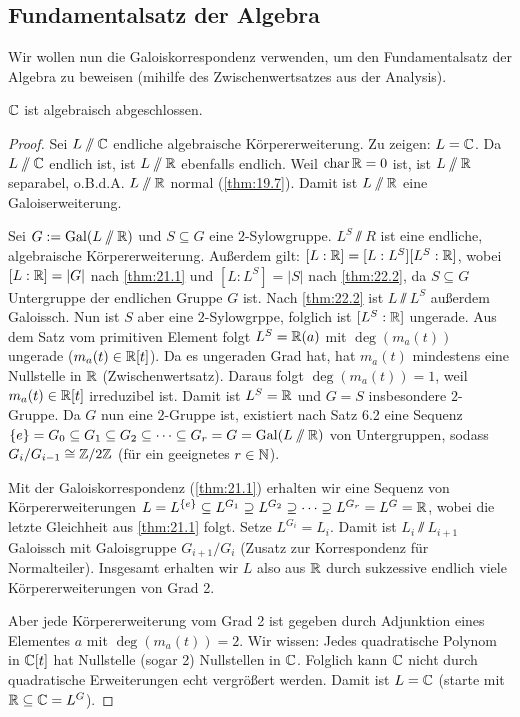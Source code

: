 \documentclass[12pt,a4paper]{scrartcl}
\begin{document}
\subsection{Fundamentalsatz der Algebra}
Wir wollen nun die Galoiskorrespondenz verwenden, um den Fundamentalsatz der Algebra zu beweisen (mihilfe des Zwischenwertsatzes aus der Analysis).
\begin{satz}\label{thm:fundamentalsatz}
	$\mathbb C$ ist algebraisch abgeschlossen.
\end{satz}
\begin{proof}
	Sei $L\sslash \mathbb C$ endliche algebraische Körpererweiterung. Zu zeigen: $L = \mathbb C$. Da $L\sslash \mathbb C$ endlich ist, ist $L\sslash \mathbb R$ ebenfalls endlich. Weil $\operatorname{char} \mathbb R= 0$ ist, ist $L\sslash \mathbb R$ separabel, o.B.d.A. $L\sslash \mathbb R$ normal (\ref{thm:19.7}). Damit ist $L\sslash \mathbb R$ eine Galoiserweiterung.
	
	Sei $G:= \operatorname{Gal}(L\sslash \mathbb R)$ und $S\subseteq G$ eine $2$-Sylowgruppe. $L^S\sslash R$ ist eine endliche, algebraische Körpererweiterung. Außerdem gilt: $[L:\mathbb R] = [L:L^S][L^S:\mathbb R]$, wobei $[L:\mathbb R] = |G|$ nach \ref{thm:21.1} und $[L:L^S] = |S|$ nach \ref{thm:22.2}, da $S\subseteq G$ Untergruppe der endlichen Gruppe $G$ ist. Nach \ref{thm:22.2} ist $L\sslash L^S$ außerdem Galoissch. Nun ist $S$ aber eine $2$-Sylowgrppe, folglich ist $[L^S:\mathbb R]$ ungerade. Aus dem Satz vom primitiven Element folgt $L^S = \mathbb R(a)$ mit $\deg(m_a(t))$ ungerade ($m_a(t)\in\mathbb R[t]$). Da es ungeraden Grad hat, hat $m_a(t)$ mindestens eine Nullstelle in $\mathbb R$ (Zwischenwertsatz). Daraus folgt $\deg(m_a(t)) = 1$, weil $m_a(t)\in\mathbb R[t]$ irreduzibel ist. Damit ist $L^S =\mathbb R$ und $G =S$ insbesondere $2$-Gruppe. Da $G$ nun eine $2$-Gruppe ist, existiert nach Satz 6.2 eine Sequenz $\{e\} = G_0\subseteq G_1\subseteq G_2\subseteq\dots\subseteq G_r = G = \operatorname{Gal}(L\sslash \mathbb R)$ von Untergruppen, sodass $G_i/G_{i-1} \cong \mathbb Z/2\mathbb Z$ (für ein geeignetes $r\in\mathbb N$).
	
	Mit der Galoiskorrespondenz (\ref{thm:21.1}) erhalten wir eine Sequenz von Körpererweiterungen $L = L^{\{e\}}\subseteq L^{G_1}\supseteq L^{G_2}\supseteq\dots \supseteq L^{G_r} = L^G = \mathbb R$, wobei die letzte Gleichheit aus \ref{thm:21.1} folgt. Setze $L^{G_i} = L_i$. Damit ist $L_i\sslash L_{i+1}$ Galoissch mit Galoisgruppe $G_{i+1}/G_i$ (Zusatz zur Korrespondenz für Normalteiler). Insgesamt erhalten wir $L$ also aus $\mathbb R$ durch sukzessive endlich viele Körpererweiterungen von Grad 2.
	
	Aber jede Körpererweiterung vom Grad 2 ist gegeben durch Adjunktion eines Elementes $a$ mit $\deg(m_a(t)) = 2$. Wir wissen: Jedes quadratische Polynom in $\mathbb C[t]$ hat Nullstelle (sogar 2) Nullstellen in $\mathbb C$. Folglich kann $\mathbb C$ nicht durch quadratische Erweiterungen echt vergrößert werden. Damit ist $L = \mathbb C$ (starte mit $\mathbb R\subseteq \mathbb C = L^{G}$). %
	
\end{proof}
\end{document}
